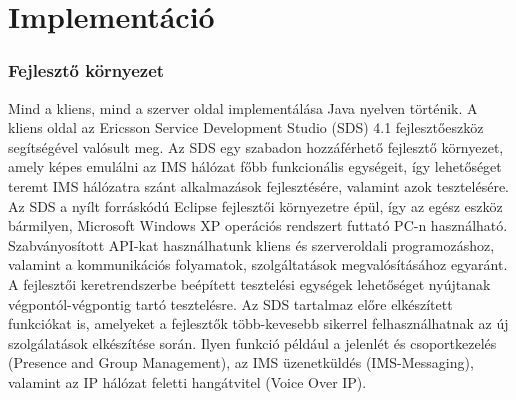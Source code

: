 \section{Implementáció}

\subsubsection{Fejlesztő környezet}

Mind a kliens, mind a szerver oldal implementálása Java nyelven történik. A kliens oldal az Ericsson Service Development Studio (SDS) 4.1 fej\-lesz\-tő\-esz\-köz segítségével valósult meg. Az SDS egy szabadon hozzáférhető fejlesztő környezet, amely képes emulálni az IMS hálózat főbb funkcionális egységeit, így lehetőséget teremt IMS hálózatra szánt alkalmazások fejlesztésére, valamint azok tesztelésére. Az SDS a nyílt forráskódú Eclipse fejlesztői környezetre épül, így az egész eszköz bármilyen, Microsoft Windows XP operációs rendszert futtató PC-n használható. Szabványosított API-kat használhatunk kliens és szer\-ver\-ol\-da\-li programozáshoz, valamint a kommunikációs folyamatok, szolgáltatások megvalósításához egyaránt. A fejlesztői keretrendszerbe beépített tesztelési egységek lehetőséget nyújtanak végpontól-végpontig tartó tesztelésre. Az SDS tartalmaz előre elkészített funkciókat is, amelyeket a fejlesztők 
több-kevesebb sikerrel %
 felhasználhatnak az új szolgálatások elkészítése során. Ilyen funkció például a jelenlét és csoportkezelés (Presence and Group Management), az IMS üzenetküldés (IMS-Messaging), valamint az IP hálózat feletti hangátvitel (Voice Over IP).
